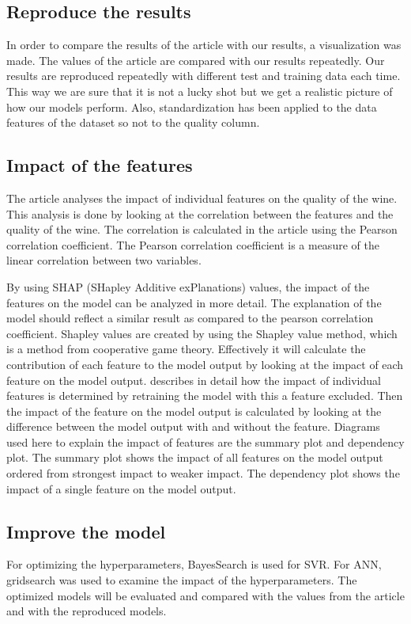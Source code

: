\documentclass{article}
\begin{document}
\subsection{Reproduce the results}
In order to compare the results of the article with our results, a visualization was made. The values of the article \cite{dahal2021prediction} are compared with our results repeatedly. Our results are reproduced repeatedly with different test and training data each time. This way we are sure that it is not a lucky shot but we get a realistic picture of how our models perform.
Also, standardization has been applied to the data features of the dataset so not to the quality column.

\subsection{Impact of the features}
The article analyses the impact of individual features on the quality of the wine.
This analysis is done by looking at the correlation between the features and the quality of the wine.
The correlation is calculated in the article using the Pearson correlation coefficient.
The Pearson correlation coefficient is a measure of the linear correlation between two variables.

By using SHAP (SHapley Additive exPlanations) values, the impact of the features on the model can be analyzed in more detail.
The explanation of the model should reflect a similar result as compared to the pearson correlation coefficient.
Shapley values are created by using the Shapley value method, which is a method from cooperative game theory. Effectively it will calculate the contribution of each feature to the model output by looking at the impact of each feature on the model output.
\cite{lundberg2017unified} describes in detail how the impact of individual features is determined by retraining the model with this a feature excluded.
Then the impact of the feature on the model output is calculated by looking at the difference between the model output with and without the feature.
Diagrams used here to explain the impact of features are the summary plot and dependency plot.
The summary plot shows the impact of all features on the model output ordered from strongest impact to weaker impact.
The dependency plot shows the impact of a single feature on the model output.

\subsection{Improve the model}
For optimizing the hyperparameters, BayesSearch is used for SVR. For ANN, gridsearch was used to examine the impact of the hyperparameters. The optimized models will be evaluated and compared with the values from the article and with the reproduced models.
\end{document}
